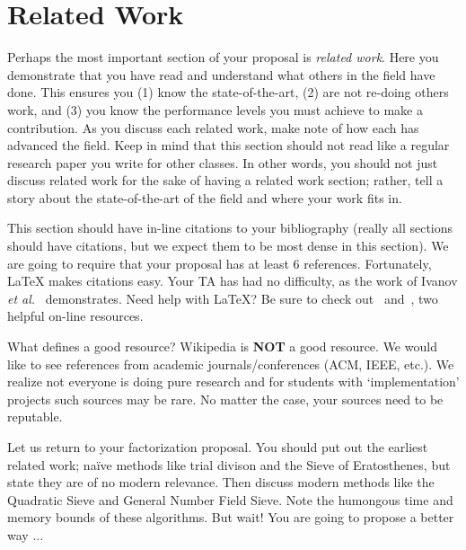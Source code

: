 \documentclass{sig-alternate}
\begin{document}
\section{Related Work}
\label{sec:related_work}
Perhaps the most important section of your proposal is \textit{related
  work}. Here you demonstrate that you have read and understand what
others in the field have done. This ensures you (1) know the
state-of-the-art, (2) are not re-doing others work, and (3) you know
the performance levels you must achieve to make a contribution. As you
discuss each related work, make note of how each has advanced the
field. Keep in mind that this section should not read like a regular
research paper you write for other classes. In other words, you should
not just discuss related work for the sake of having a related work
section; rather, tell a story about the state-of-the-art of the field
and where your work fits in.

This section should have in-line citations to your bibliography
(really all sections should have citations, but we expect them to be
most dense in this section). We are going to require that your
proposal has at least $6$ references. Fortunately, \LaTeX{} makes
citations easy. Your TA has had no difficulty, as the work of Ivanov
\textit{et al.}~\cite{ivanov14} demonstrates. Need help with \LaTeX{}?
Be sure to check out~\cite{latex_wikibook} and~\cite{ctan_pdf}, two
helpful on-line resources.

What defines a good resource? Wikipedia is \textbf{NOT} a good
resource. We would like to see references from academic
journals/conferences (ACM, IEEE, etc.). We realize not everyone is
doing pure research and for students with `implementation' projects
such sources may be rare. No matter the case, your sources need to be
reputable.

Let us return to your factorization proposal. You should put out the
earliest related work; na\"{i}ve methods like trial divison and the
Sieve of Eratosthenes, but state they are of no modern relevance. Then
discuss modern methods like the Quadratic Sieve and General Number
Field Sieve. Note the humongous time and memory bounds of these
algorithms. But wait! You are going to propose a better way $\ldots$
\end{document}
